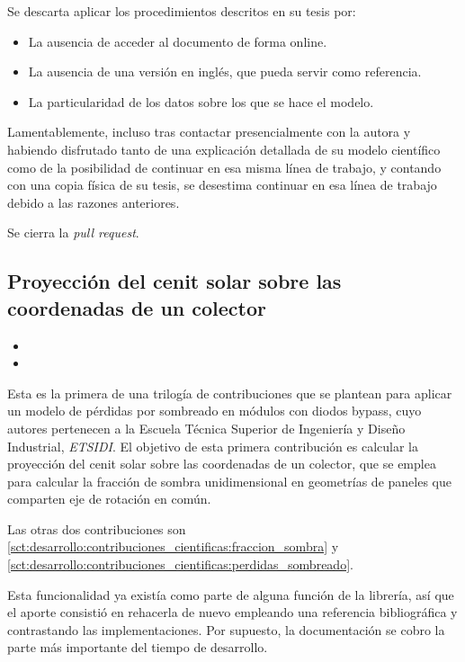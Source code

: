 Se descarta aplicar los procedimientos descritos en su tesis \cite{Martín_Chivelet_1999} por:

\begin{itemize}
    \item La ausencia de acceder al documento de forma online.
    \item La ausencia de una versión en inglés, que pueda servir como referencia.
    \item La particularidad de los datos sobre los que se hace el modelo.
\end{itemize}

Lamentablemente, incluso tras contactar presencialmente con la autora y habiendo disfrutado tanto de una explicación detallada de su modelo científico como de la posibilidad de continuar en esa misma línea de trabajo, y contando con una copia física de su tesis, se desestima continuar en esa línea de trabajo debido a las razones anteriores.

Se cierra la \textit{pull request}.

\subsection{Proyección del cenit solar sobre las coordenadas de un colector} \label{sct:desarrollo:contribuciones_cientificas:proyeccion_cenit}

\begin{itemize}
    \item {}
    \item {}
\end{itemize}

Esta es la primera de una trilogía de contribuciones que se plantean para aplicar un modelo de pérdidas por sombreado en módulos con diodos bypass, cuyo autores pertenecen a la Escuela Técnica Superior de Ingeniería y Diseño Industrial, \textit{ETSIDI}. El objetivo de esta primera contribución es calcular la proyección del cenit solar sobre las coordenadas de un colector, que se emplea para calcular la fracción de sombra unidimensional en geometrías de paneles que comparten eje de rotación en común.

Las otras dos contribuciones son \ref{sct:desarrollo:contribuciones_cientificas:fraccion_sombra} y \ref{sct:desarrollo:contribuciones_cientificas:perdidas_sombreado}.

Esta funcionalidad ya existía como parte de alguna función de la librería, así que el aporte consistió en rehacerla de nuevo empleando una referencia bibliográfica y contrastando las implementaciones. Por supuesto, la documentación se cobro la parte más importante del tiempo de desarrollo.

